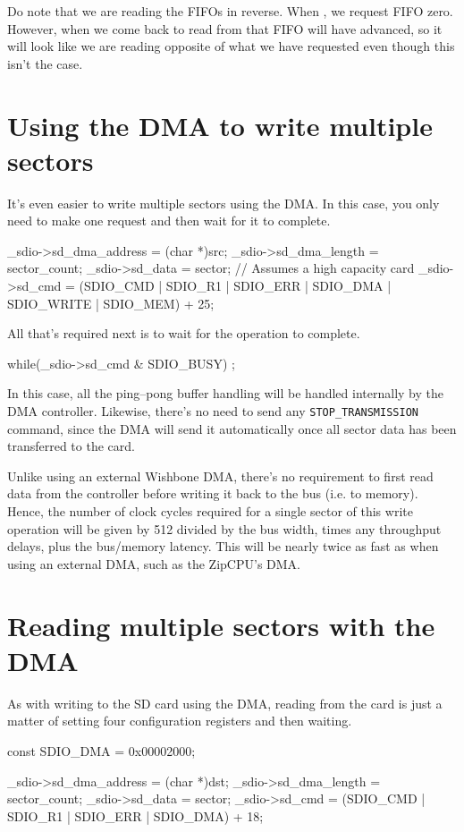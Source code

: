 \documentclass{gqtekspec}
\begin{document}
Do note that we are reading the FIFOs in reverse.  When ,
we request FIFO zero.  However, when we come back to read from that FIFO
 will have advanced, so it will look like we are reading opposite
of what we have requested even though this isn't the case.
\section{Using the DMA to write multiple sectors}
It's even easier to write multiple sectors using the DMA.  In this case,
you only need to make one request and then wait for it to complete.

\begin{zCpp}
	_sdio->sd_dma_address = (char *)src;
	_sdio->sd_dma_length = sector_count;
	_sdio->sd_data = sector;	// Assumes a high capacity card
	_sdio->sd_cmd  = (SDIO_CMD | SDIO_R1 | SDIO_ERR | SDIO_DMA
				| SDIO_WRITE | SDIO_MEM) + 25;
\end{zCpp}

All that's required next is to wait for the operation to complete.

\begin{zCpp}
	while(_sdio->sd_cmd & SDIO_BUSY)
		;
\end{zCpp}

In this case, all the ping--pong buffer handling will be handled internally
by the DMA controller.  Likewise, there's no need to send any
{\tt STOP\_TRANSMISSION} command, since the DMA will send it automatically
once all sector data has been transferred to the card.

Unlike using an external Wishbone DMA, there's no requirement to first read
data from the controller before writing it back to the bus (i.e. to memory).
Hence, the number of clock cycles required for a single sector of this write
operation will be given by 512 divided by the bus width, times any throughput
delays, plus the bus/memory latency.  This will be nearly twice as fast as
when using an external DMA, such as the ZipCPU's DMA.
\section{Reading multiple sectors with the DMA}
As with writing to the SD card using the DMA, reading from the card is just
a matter of setting four configuration registers and then waiting.

\begin{zCpp}
	const	SDIO_DMA  = 0x00002000;

	_sdio->sd_dma_address = (char *)dst;
	_sdio->sd_dma_length = sector_count;
	_sdio->sd_data = sector;
	_sdio->sd_cmd  = (SDIO_CMD | SDIO_R1 | SDIO_ERR | SDIO_DMA) + 18;
\end{zCpp}
\end{document}
